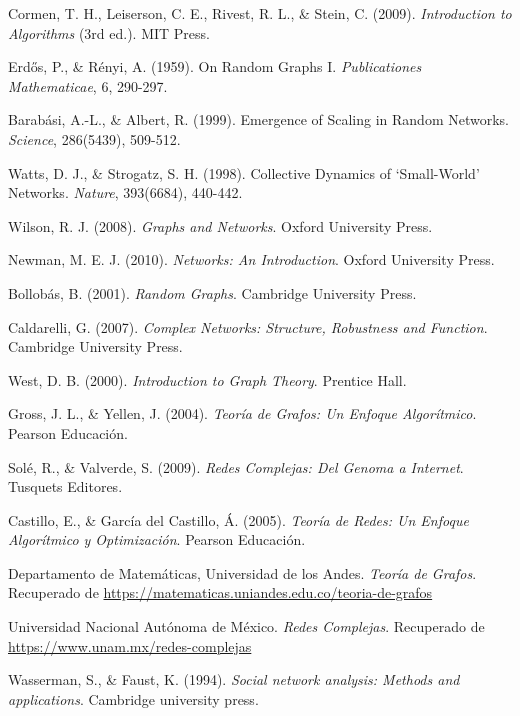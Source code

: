 \begin{thebibliography}{9}
Cormen, T. H., Leiserson, C. E., Rivest, R. L., \& Stein, C. (2009). \textit{Introduction to Algorithms} (3rd ed.). MIT Press.

    
Erdős, P., \& Rényi, A. (1959). On Random Graphs I. \textit{Publicationes Mathematicae}, 6, 290-297.

Barabási, A.-L., \& Albert, R. (1999). Emergence of Scaling in Random Networks. \textit{Science}, 286(5439), 509-512.

Watts, D. J., \& Strogatz, S. H. (1998). Collective Dynamics of ‘Small-World’ Networks. \textit{Nature}, 393(6684), 440-442.

    Wilson, R. J. (2008). \textit{Graphs and Networks}. Oxford University Press.
    
    Newman, M. E. J. (2010). \textit{Networks: An Introduction}. Oxford University Press.
    
    Bollobás, B. (2001). \textit{Random Graphs}. Cambridge University Press.
    
    Caldarelli, G. (2007). \textit{Complex Networks: Structure, Robustness and Function}. Cambridge University Press.
    
    West, D. B. (2000). \textit{Introduction to Graph Theory}. Prentice Hall.

Gross, J. L., \& Yellen, J. (2004). \textit{Teoría de Grafos: Un Enfoque Algorítmico}. Pearson Educación.

Solé, R., \& Valverde, S. (2009). \textit{Redes Complejas: Del Genoma a Internet}. Tusquets Editores.

Castillo, E., \& García del Castillo, Á. (2005). \textit{Teoría de Redes: Un Enfoque Algorítmico y Optimización}. Pearson Educación.

Departamento de Matemáticas, Universidad de los Andes. \textit{Teoría de Grafos}. Recuperado de \url{https://matematicas.uniandes.edu.co/teoria-de-grafos}

Universidad Nacional Autónoma de México. \textit{Redes Complejas}. Recuperado de \url{https://www.unam.mx/redes-complejas}


Wasserman, S., \& Faust, K. (1994). \textit{Social network analysis: Methods and applications}. Cambridge university press.


\end{thebibliography}
